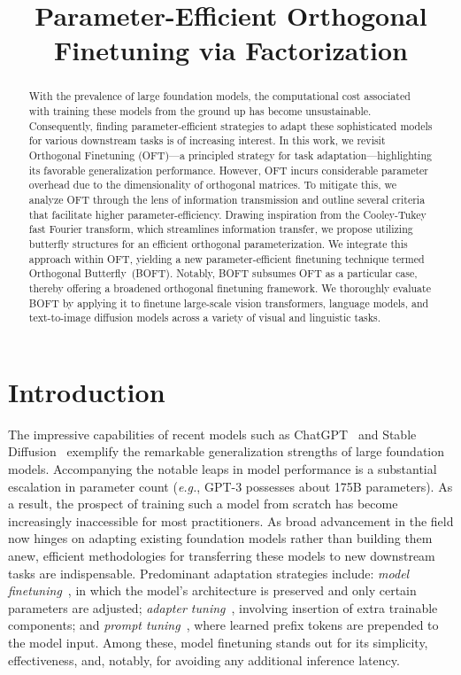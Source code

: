 \title{Parameter-Efficient Orthogonal Finetuning via Factorization}

\begin{abstract}
With the prevalence of large foundation models, the computational cost associated with training these models from the ground up has become unsustainable. Consequently, finding parameter-efficient strategies to adapt these sophisticated models for various downstream tasks is of increasing interest. In this work, we revisit Orthogonal Finetuning (OFT)—a principled strategy for task adaptation—highlighting its favorable generalization performance. However, OFT incurs considerable parameter overhead due to the dimensionality of orthogonal matrices. To mitigate this, we analyze OFT through the lens of information transmission and outline several criteria that facilitate higher parameter-efficiency. Drawing inspiration from the Cooley-Tukey fast Fourier transform, which streamlines information transfer, we propose utilizing butterfly structures for an efficient orthogonal parameterization. We integrate this approach within OFT, yielding a new parameter-efficient finetuning technique termed Orthogonal Butterfly~(BOFT). Notably, BOFT subsumes OFT as a particular case, thereby offering a broadened orthogonal finetuning framework. We thoroughly evaluate BOFT by applying it to finetune large-scale vision transformers, language models, and text-to-image diffusion models across a variety of visual and linguistic tasks.
\end{abstract}

\section{Introduction}

The impressive capabilities of recent models such as ChatGPT~\cite{brown2020language,chen2021evaluating} and Stable Diffusion~\cite{rombach2022high} exemplify the remarkable generalization strengths of large foundation models. Accompanying the notable leaps in model performance is a substantial escalation in parameter count (\emph{e.g.}, GPT-3 possesses about 175B parameters). As a result, the prospect of training such a model from scratch has become increasingly inaccessible for most practitioners. As broad advancement in the field now hinges on adapting existing foundation models rather than building them anew, efficient methodologies for transferring these models to new downstream tasks are indispensable. Predominant adaptation strategies include: \emph{model finetuning}~\cite{hulora2022,zaken2022bitfit,guo2020parameter,raffel2020exploring,qiu2023controlling,zhang2022adaptive,chavan2023one}, in which the model’s architecture is preserved and only certain parameters are adjusted; \emph{adapter tuning}~\cite{rebuffi2017learning,houlsby2019parameter,pfeiffer2020adapterfusion,lin2020exploring,he2021towards}, involving insertion of extra trainable components; and \emph{prompt tuning}~\cite{li2021prefix,lester2021power}, where learned prefix tokens are prepended to the model input. Among these, model finetuning stands out for its simplicity, effectiveness, and, notably, for avoiding any additional inference latency.

